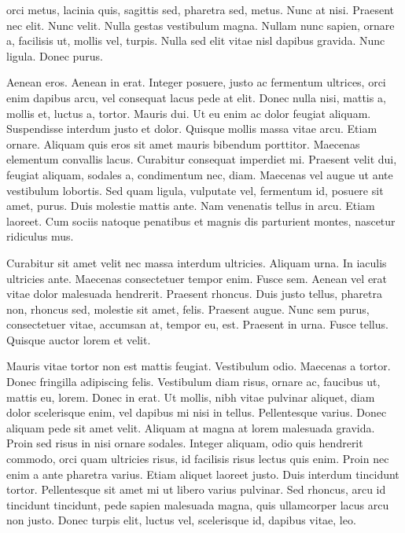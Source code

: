 \documentclass[letterpaper,twocolumn]{article}
\begin{document}
orci metus, lacinia quis, sagittis sed, pharetra sed, metus. Nunc at nisi.
Praesent nec elit. Nunc velit. Nulla
\sparklinewidth=0.2pt
\sparkscale=125pt
\sparkunit=0.5pt
\sparkymin=0pt
gestas vestibulum magna. Nullam nunc sapien, ornare a, facilisis ut, mollis
vel, turpis. Nulla sed elit vitae nisl 
\sparkscale=200pt
dapibus gravida. Nunc ligula. Donec purus.

Aenean eros. Aenean in erat. Integer posuere, justo ac fermentum
ultrices, orci enim dapibus arcu, vel consequat lacus pede at
elit. Donec nulla nisi, mattis a, mollis et, luctus a, tortor. Mauris
dui. Ut eu enim ac dolor feugiat aliquam. Suspendisse interdum justo
et dolor. Quisque mollis massa vitae arcu. Etiam ornare. Aliquam quis
eros sit amet mauris bibendum porttitor. Maecenas elementum convallis
lacus. Curabitur consequat imperdiet mi. Praesent velit dui, feugiat
aliquam, sodales a, condimentum nec, diam. Maecenas vel augue ut ante
vestibulum lobortis. Sed quam ligula, vulputate vel, fermentum id,
posuere sit amet, purus. Duis molestie mattis ante. Nam venenatis
tellus in arcu. Etiam laoreet. Cum sociis natoque penatibus et magnis
dis parturient montes, nascetur ridiculus mus.

Curabitur sit amet velit nec massa interdum ultricies. Aliquam
urna. In iaculis ultricies ante. Maecenas consectetuer tempor
enim. Fusce sem. Aenean vel erat vitae dolor malesuada
hendrerit. Praesent rhoncus. Duis justo tellus, pharetra non, rhoncus
sed, molestie sit amet, felis. Praesent augue. Nunc sem purus,
consectetuer vitae, accumsan at, tempor eu, est. Praesent in
urna. Fusce tellus. Quisque auctor lorem et velit.

Mauris vitae tortor non est mattis feugiat. Vestibulum odio. Maecenas
a tortor. Donec fringilla adipiscing felis. Vestibulum diam risus,
ornare ac, faucibus ut, mattis eu, lorem. Donec in erat. Ut mollis,
nibh vitae pulvinar aliquet, diam dolor scelerisque enim, vel dapibus
mi nisi in tellus. Pellentesque varius. Donec aliquam pede sit amet
velit. Aliquam at magna at lorem malesuada gravida. Proin sed risus in
nisi ornare sodales. Integer aliquam, odio quis hendrerit commodo,
orci quam ultricies risus, id facilisis risus lectus quis enim. Proin
nec enim a ante pharetra varius. Etiam aliquet laoreet justo. Duis
interdum tincidunt tortor. Pellentesque sit amet mi ut libero varius
pulvinar. Sed rhoncus, arcu id tincidunt tincidunt, pede sapien
malesuada magna, quis ullamcorper lacus arcu non justo. Donec turpis
elit, luctus vel, scelerisque id, dapibus vitae, leo.
\end{document}
